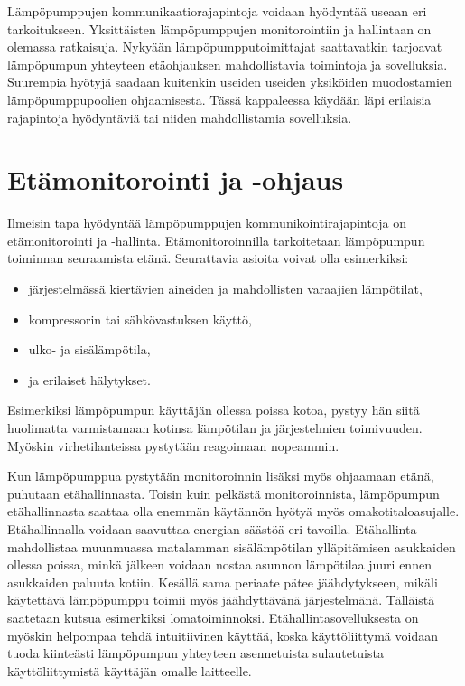Lämpöpumppujen kommunikaatiorajapintoja voidaan hyödyntää useaan eri tarkoitukseen. Yksittäisten lämpöpumppujen monitorointiin ja hallintaan on olemassa ratkaisuja. Nykyään lämpöpumpputoimittajat saattavatkin tarjoavat lämpöpumpun yhteyteen etäohjauksen mahdollistavia toimintoja ja sovelluksia. Suurempia hyötyjä saadaan kuitenkin useiden useiden yksiköiden muodostamien lämpöpumppupoolien ohjaamisesta. Tässä kappaleessa käydään läpi erilaisia rajapintoja hyödyntäviä tai niiden mahdollistamia sovelluksia.


\section{Etämonitorointi ja -ohjaus}

  Ilmeisin tapa hyödyntää lämpöpumppujen kommunikointirajapintoja on etämonitorointi ja -hallinta. Etämonitoroinnilla tarkoitetaan lämpöpumpun toiminnan seuraamista etänä. Seurattavia asioita voivat olla esimerkiksi:
  \begin{itemize}
    \item järjestelmässä kiertävien aineiden ja mahdollisten varaajien lämpötilat,
    \item kompressorin tai sähkövastuksen käyttö,
    \item ulko- ja sisälämpötila,
    \item ja erilaiset hälytykset.
  \end{itemize} \parencite{Latomaki}
  Esimerkiksi lämpöpumpun käyttäjän ollessa poissa kotoa, pystyy hän siitä huolimatta varmistamaan kotinsa lämpötilan ja järjestelmien toimivuuden. Myöskin virhetilanteissa pystytään reagoimaan nopeammin.

  Kun lämpöpumppua pystytään monitoroinnin lisäksi myös ohjaamaan etänä, puhutaan etähallinnasta. Toisin kuin pelkästä monitoroinnista, lämpöpumpun etähallinnasta saattaa olla enemmän käytännön hyötyä myös omakotitaloasujalle. Etähallinnalla voidaan saavuttaa energian säästöä eri tavoilla. Etähallinta mahdollistaa muunmuassa matalamman sisälämpötilan ylläpitämisen asukkaiden ollessa poissa, minkä jälkeen voidaan nostaa asunnon lämpötilaa juuri ennen asukkaiden paluuta kotiin. Kesällä sama periaate pätee jäähdytykseen, mikäli käytettävä lämpöpumppu toimii myös jäähdyttävänä järjestelmänä. Tälläistä saatetaan kutsua esimerkiksi lomatoiminnoksi. Etähallintasovelluksesta on myöskin helpompaa tehdä intuitiivinen käyttää, koska käyttöliittymä voidaan tuoda kiinteästi lämpöpumpun yhteyteen asennetuista sulautetuista käyttöliittymistä käyttäjän omalle laitteelle.

